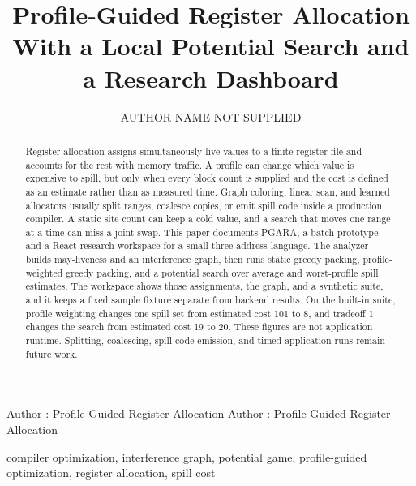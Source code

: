 \documentclass{ieeeaccess}
\begin{document}
\vol{--}
\Year{--}

\title{Profile-Guided Register Allocation With a Local Potential Search and a Research Dashboard}

\author{\uppercase{Author Name Not Supplied}}
\address[1]{Affiliation, institution, city, and country were not supplied.}

\markboth
{Author \headeretal: Profile-Guided Register Allocation}
{Author \headeretal: Profile-Guided Register Allocation}


\begin{abstract}
Register allocation assigns simultaneously live values to a finite register file and accounts for the rest with memory traffic.
A profile can change which value is expensive to spill, but only when every block count is supplied and the cost is defined as an estimate rather than as measured time.
Graph coloring, linear scan, and learned allocators usually split ranges, coalesce copies, or emit spill code inside a production compiler.
A static site count can keep a cold value, and a search that moves one range at a time can miss a joint swap.
This paper documents PGARA, a batch prototype and a React research workspace for a small three-address language.
The analyzer builds may-liveness and an interference graph, then runs static greedy packing, profile-weighted greedy packing, and a potential search over average and worst-profile spill estimates.
The workspace shows those assignments, the graph, and a synthetic suite, and it keeps a fixed sample fixture separate from backend results.
On the built-in suite, profile weighting changes one spill set from estimated cost 101 to 8, and tradeoff 1 changes the search from estimated cost 19 to 20.
These figures are not application runtime.
Splitting, coalescing, spill-code emission, and timed application runs remain future work.
\end{abstract}

\begin{keywords}
compiler optimization, interference graph, potential game, profile-guided optimization, register allocation, spill cost
\end{keywords}

\titlepgskip=-15pt
\maketitle
\end{document}
